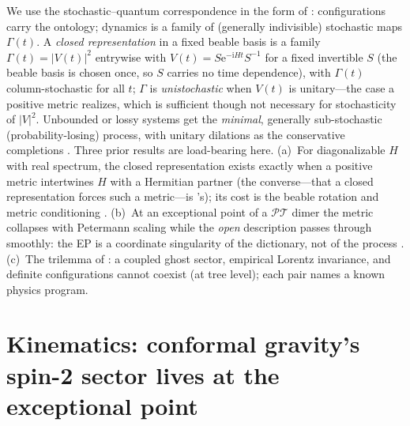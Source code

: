 \documentclass[11pt]{article}
\theoremstyle{definition}
\theoremstyle{remark}
\newcommand{\PT}{\mathcal{PT}}
\newcommand{\ii}{\mathrm{i}}
\newcommand{\ee}{\mathrm{e}}
\begin{document}
We use the stochastic--quantum correspondence in the form of
\cite{Barandes2023,Barandes2025,indivisible}: configurations carry the
ontology; dynamics is a family of (generally indivisible) stochastic
maps $\Gamma(t)$. A \emph{closed representation} in a fixed beable
basis is a family $\Gamma(t)=|V(t)|^{2}$ entrywise with
$V(t)=S\ee^{-\ii Ht}S^{-1}$ for a fixed invertible $S$ (the beable
basis is chosen once, so $S$ carries no time dependence), with
$\Gamma(t)$ column-stochastic for all $t$; $\Gamma$ is
\emph{unistochastic} when $V(t)$ is unitary---the case a positive
metric realizes, which is sufficient though not necessary for
stochasticity of $|V|^{2}$. Unbounded or lossy
systems get the \emph{minimal}, generally sub-stochastic
(probability-losing) process, with unitary dilations as the
conservative completions \cite{indivisible}. Three prior results are
load-bearing here. (a)~For diagonalizable $H$ with real spectrum,
the closed representation exists exactly when a positive metric
intertwines $H$ with a Hermitian partner (the converse---that a closed
representation forces such a metric---is \cite{indivisible}'s); its cost is the beable
rotation and metric conditioning \cite{indivisible}. (b)~At an
exceptional point of a $\PT$ dimer the metric collapses with
Petermann scaling while the \emph{open} description passes through
smoothly: the EP is a coordinate singularity of the dictionary, not
of the process \cite{indivisible}. (c)~The trilemma of
\cite{instantaneous}: a coupled ghost sector, empirical Lorentz
invariance, and definite configurations cannot coexist (at tree level); each pair
names a known physics program.

\section{Kinematics: conformal gravity's spin-2 sector lives at
the exceptional point}
\label{sec:kinematics}
\end{document}
